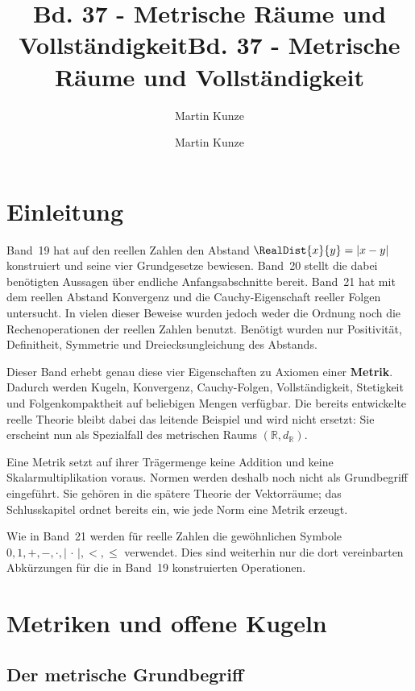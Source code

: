 \documentclass[main.tex]{subfiles}
\title{Bd. 37 - Metrische Räume und Vollständigkeit}
\author{Martin Kunze}
\date{}
\begin{document}
\title{Bd. 37 - Metrische Räume und Vollständigkeit}
\author{Martin Kunze}
\date{}
\hypersetup{pageanchor=false}
\maketitle
\hypersetup{pageanchor=true}
\setcounter{tocdepth}{3}
\tableofcontents
\setcounter{file}{37}
\renewcommand{\FormulaBandID}{37}

\chapter{Einleitung}

Band~19 hat auf den reellen Zahlen den Abstand
\(\RealDist{x}{y}=|x-y|\) konstruiert und seine vier Grundgesetze bewiesen.
Band~20 stellt die dabei benötigten Aussagen über endliche Anfangsabschnitte
bereit. Band~21 hat mit dem reellen Abstand Konvergenz und die
Cauchy-Eigenschaft reeller Folgen untersucht. In vielen dieser Beweise wurden
jedoch weder die Ordnung noch die Rechenoperationen der reellen Zahlen
benutzt. Benötigt wurden nur Positivität, Definitheit, Symmetrie und
Dreiecksungleichung des Abstands.

Dieser Band erhebt genau diese vier Eigenschaften zu Axiomen einer
\textbf{Metrik}. Dadurch werden Kugeln, Konvergenz, Cauchy-Folgen,
Vollständigkeit, Stetigkeit und Folgenkompaktheit auf beliebigen Mengen
verfügbar. Die bereits entwickelte reelle Theorie bleibt dabei das leitende
Beispiel und wird nicht ersetzt: Sie erscheint nun als Spezialfall des
metrischen Raums \((\mathbb R,d_{\mathbb R})\).

Eine Metrik setzt auf ihrer Trägermenge keine Addition und keine
Skalarmultiplikation voraus. Normen werden deshalb noch nicht als
Grundbegriff eingeführt. Sie gehören in die spätere Theorie der Vektorräume;
das Schlusskapitel ordnet bereits ein, wie jede Norm eine Metrik erzeugt.

Wie in Band~21 werden für reelle Zahlen die gewöhnlichen Symbole
\(0,1,+,-,\cdot,|\,\cdot\,|,<,\leq\) verwendet. Dies sind weiterhin nur die
dort vereinbarten Abkürzungen für die in Band~19 konstruierten Operationen.

\chapter{Metriken und offene Kugeln}

\section{Der metrische Grundbegriff}
\end{document}

